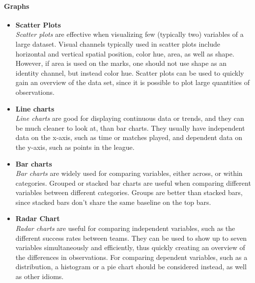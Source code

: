 \documentclass[Report.tex]{subfiles}
\begin{document}
\paragraph{Graphs\\}
\begin{itemize}
  \item \textbf{Scatter Plots}
  \\\emph{Scatter plots} are effective when visualizing few (typically two) variables
  of a large dataset\cite[Chapter 5, p. 54]{Iliinsky}. Visual channels typically used in
  scatter plots include horizontal and vertical spatial position, color hue, area, as well as shape. However,
  if area is used on the marks, one should not use shape as an identity channel,
  but instead color hue. 
  Scatter plots can be used to quickly gain an overview of the data set, since
  it is possible to plot large quantities of observations.
  
  \item \textbf{Line charts}
  \\\emph{Line charts} are good for displaying continuous data or trends, and they can
  be much cleaner to look at, than bar charts. They usually have independent
  data on the x-axis, such as time or matches played, and dependent data on the
  y-axis, such as points in the league.
  
  \item \textbf{Bar charts}
  \\\emph{Bar charts} are widely used for comparing variables, either across, or within
  categories. Grouped or stacked bar charts are useful when comparing different variables between different categories.
 Groups are better than stacked bars, since stacked
  bars don't share the same baseline on the top bars.
  
  \item \textbf{Radar Chart}
  \\\emph{Radar charts} are useful for comparing independent variables, such as the
  different success rates between teams. They can be used to show up to seven
  variables simultaneously and efficiently, thus quickly creating an overview of the
  differences in observations. For comparing dependent variables, such as a
  distribution, a histogram or a pie chart should be considered instead, as well
  as other idioms.

\end{itemize}
\end{document}
